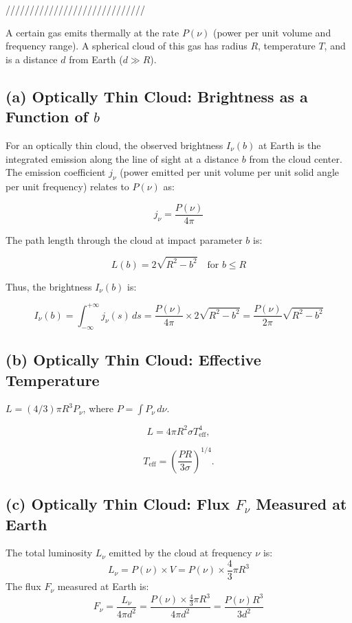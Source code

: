 \documentclass[12pt]{article}
\begin{document}
/////////////////////////////

A certain gas emits thermally at the rate \( P(\nu) \) (power per unit volume and frequency range). A spherical cloud of this gas has radius \( R \), temperature \( T \), and is a distance \( d \) from Earth (\( d \gg R \)).

\subsection*{(a) Optically Thin Cloud: Brightness as a Function of \( b \)}

For an optically thin cloud, the observed brightness \( I_\nu(b) \) at Earth is the integrated emission along the line of sight at a distance \( b \) from the cloud center. The emission coefficient \( j_\nu \) (power emitted per unit volume per unit solid angle per unit frequency) relates to \( P(\nu) \) as:

\[
    j_\nu = \frac{P(\nu)}{4\pi}
\]

The path length through the cloud at impact parameter \( b \) is:

\[
    L(b) = 2 \sqrt{R^2 - b^2} \quad \text{for } b \leq R
\]

Thus, the brightness \( I_\nu(b) \) is:

\[
    I_\nu(b) = \int_{-\infty}^{+\infty} j_\nu(s) \, ds = \frac{P(\nu)}{4\pi} \times 2 \sqrt{R^2 - b^2} = \frac{P(\nu)}{2\pi} \sqrt{R^2 - b^2}
\]

\subsection*{(b) Optically Thin Cloud: Effective Temperature}

\( L = (4/3) \pi R^3 P_\nu \), where \( P = \int P_\nu \, d\nu \).

\[
    L = 4 \pi R^2 \sigma T_{\text{eff}}^4,
\]

\[
    T_{\text{eff}} = \left( \frac{P R}{3 \sigma} \right)^{1/4}.
\]

\subsection*{(c) Optically Thin Cloud: Flux \( F_\nu \) Measured at Earth}

The total luminosity \( L_\nu \) emitted by the cloud at frequency \( \nu \) is:
\[
    L_\nu = P(\nu) \times V = P(\nu) \times \frac{4}{3} \pi R^3
\]
The flux \( F_\nu \) measured at Earth is:
\[
    F_\nu = \frac{L_\nu}{4\pi d^2} = \frac{P(\nu) \times \frac{4}{3} \pi R^3}{4\pi d^2} = \frac{P(\nu) R^3}{3 d^2}
\]
\end{document}

